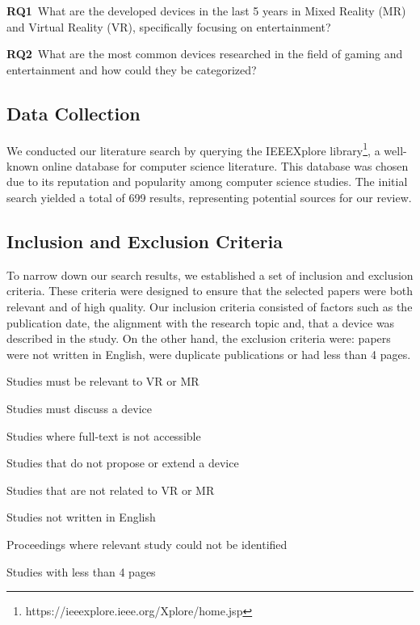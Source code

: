 \textbf{RQ1}~What are the developed devices in the last 5 years in Mixed Reality (MR) and Virtual Reality (VR), specifically focusing on entertainment? 

\textbf{RQ2}~What are the most common devices researched in the field of gaming and entertainment and how could they be categorized?

\subsection{Data Collection}
We conducted our literature search by querying the IEEEXplore library\footnote{https://ieeexplore.ieee.org/Xplore/home.jsp}, a well-known online database for computer science literature. This database was chosen due to its reputation and popularity among computer science studies. The initial search yielded a total of 699 results, representing potential sources for our review.

\subsection{Inclusion and Exclusion Criteria}
To narrow down our search results, we established a set of inclusion and exclusion criteria. These criteria were designed to ensure that the selected papers were both relevant and of high quality. Our inclusion criteria consisted of factors such as the publication date, the alignment with the research topic and, that a device was described in the study. On the other hand, the exclusion criteria were: papers were not written in English, were duplicate publications or had less than 4 pages.

\begin{description}
	\setlength\itemsep{-0.4em}
	\item[IC1] Studies must be relevant to VR or MR
	\item[IC2] Studies must discuss a device 
\end{description}

\begin{description}
	\setlength\itemsep{-0.4em}
	\item[EC1] Studies where full-text is not accessible
	\item[EC2] Studies that do not propose or extend a device
	\item[EC3] Studies that are not related to VR or MR
	\item[EC4] Studies not written in English
	\item[EC5] Proceedings where relevant study could not be identified
	\item[EC6] Studies with less than 4 pages
\end{description}


